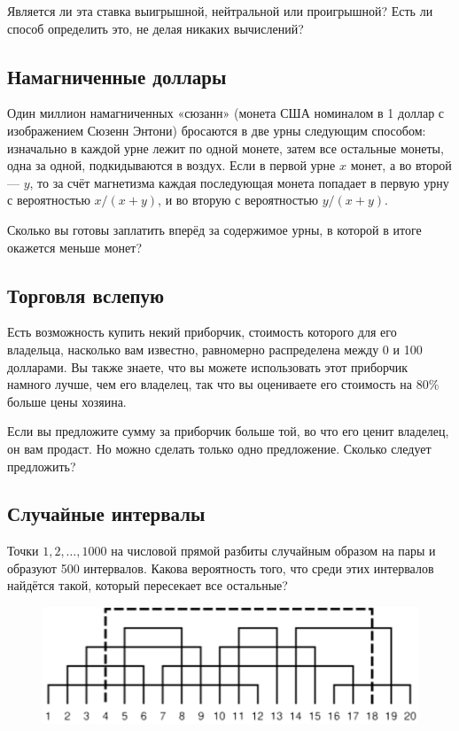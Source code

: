 \medskip

Является ли эта ставка выигрышной, нейтральной или проигрышной? Есть ли способ определить это, не делая никаких вычислений?

\subsection*{Намагниченные доллары}%

Один миллион намагниченных «сюзанн» (монета США номиналом в 1 доллар с изображением Сюзенн Энтони) бросаются в две урны следующим способом: изначально в каждой урне лежит по одной монете, затем все остальные монеты, одна за одной, подкидываются в воздух.
Если в первой урне $x$ монет, а во второй --- $y$, то за счёт магнетизма каждая последующая монета попадает в первую урну с вероятностью $x/(x+y)$, и во вторую с вероятностью $y/(x+y)$.

Сколько вы готовы заплатить вперёд за содержимое урны, в которой в итоге окажется меньше монет?

\subsection*{Торговля вслепую}%

Есть возможность купить некий приборчик, стоимость которого для его владельца, насколько вам известно, равномерно распределена между 0 и 100 долларами.
Вы также знаете, что вы можете использовать этот приборчик намного лучше, чем его владелец, так что вы оцениваете его стоимость на $80\%$ больше цены хозяина.

\medskip

Если вы предложите сумму за приборчик больше той, во что его ценит владелец, он вам продаст.
Но можно сделать только одно предложение.
Сколько следует предложить?

\subsection*{Случайные интервалы}%

Точки $1, 2,\dots, 1000$ на числовой прямой разбиты случайным образом на пары и образуют 500 интервалов.
Какова вероятность того, что среди этих интервалов найдётся такой, который пересекает все остальные?

\begin{figure}[h!]
\centering
\includegraphics[scale=0.8]{Figs/Probability/ints}
\end{figure}
